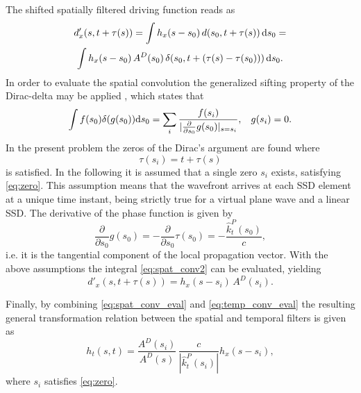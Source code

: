 \documentclass[conference]{IEEEtran}
\begin{document}
The shifted spatially filtered driving function reads as
\begin{multline}
    d'_x(s,t+ \tau(s) ) = \int h_x(s-s_0) \, d(s_0,t+ \tau(s) ) \, \td s_0 = \\
    \int h_x(s-s_0) \, A^D(s_0)\, \delta(s_0,t+ \left(\tau(s)-\tau(s_0)\right)  ) \, \td s_0.
    \label{eq:spat_conv2}
\end{multline}
In order to evaluate the spatial convolution the generalized sifting property of the Dirac-delta may be applied \cite{Firtha2019phd}, which states that
\begin{equation}
    \int f(s_0) \delta(g(s_0)) \mathrm{d} s_0 = \sum_i \frac{f(s_i)}{| \frac{\partial}{\partial s_0} g(s_0) |_{s = s_i}}, \hspace{3mm} g(s_i) = 0.
\end{equation}
In the present problem the zeros of the Dirac's argument are found where
\begin{equation}
    \tau(s_i) = t + \tau(s)
    \label{eq:zero}
\end{equation}
is satisfied.
In the following it is assumed that a single zero $s_i$ exists, satisfying \eqref{eq:zero}.
This assumption means that the wavefront arrives at each SSD element at a unique time instant, being strictly true for a virtual plane wave and a linear SSD.
The derivative of the phase function is given by
\begin{equation}
    \frac{\partial}{\partial s_0} g(s_0) = - \frac{\partial}{\partial s_0} \tau(s_0) = -\frac{\hat{k}_t^P(s_0)}{c},
\end{equation}
i.e. it is the tangential component of the local propagation vector.
With the above assumptions the integral \eqref{eq:spat_conv2} can be evaluated, yielding
\begin{equation}
    d'_x(s,t+ \tau(s) ) = h_x(s-s_i) \, A^D(s_i)
    .
    \label{eq:spat_conv_eval}
\end{equation}

Finally, by combining \eqref{eq:spat_conv_eval} and \eqref{eq:temp_conv_eval} the resulting general transformation relation between the spatial and temporal filters is given as
\begin{equation}
    h_t\left(s,t\right) = \frac{A^D(s_i)}{A^D(s)} \, \frac{ c }{|\hat{k}_t^P(s_i)|} h_x(s-s_i),
\end{equation}
where $s_i$ satisfies \eqref{eq:zero}.
\end{document}
